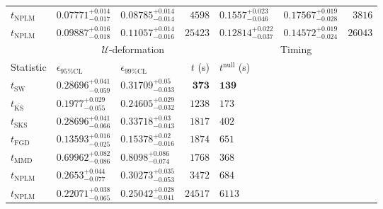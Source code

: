\begin{tabular}{l|llr|llr}
\rowcolor{red!35}	$t_{\mathrm{NPLM}}$ & $0.07771_{-0.017}^{+0.014}$ & $0.08785_{-0.014}^{+0.014}$ & $4598$ & $0.1557_{-0.046}^{+0.023}$ & $0.17567_{-0.028}^{+0.019}$ & $3816$ \\
\rowcolor{blue!35}	$t_{\mathrm{NPLM}}$ & $0.09887_{-0.018}^{+0.016}$ & $0.11057_{-0.016}^{+0.014}$ & $25423$ & $0.12814_{-0.037}^{+0.022}$ & $0.14572_{-0.024}^{+0.019}$ & $26043$ \\
	\toprule
	\multicolumn{1}{c}{} & \multicolumn{3}{c}{$\mathcal{U}$-deformation} & \multicolumn{3}{c}{Timing} \\
Statistic & $\epsilon_{95\%\mathrm{CL}}$ & $\epsilon_{99\%\mathrm{CL}}$ & $t$ (s) & $t^{\mathrm{null}}$ (s) \\
	\midrule
	$t_{\mathrm{SW}}$ & $0.28696_{-0.059}^{+0.041}$ & $0.31709_{-0.033}^{+0.05}$ & ${\mathbf{373}}$ & ${\mathbf{139}}$ \\
	$t_{\overline{\mathrm{KS}}}$ & $0.1977_{-0.055}^{+0.029}$ & $0.24605_{-0.032}^{+0.029}$ & $1238$ & $173$ \\
	$t_{\mathrm{SKS}}$ & $0.28696_{-0.066}^{+0.041}$ & $0.33718_{-0.043}^{+0.03}$ & $1817$ & $402$ \\
	$t_{\mathrm{FGD}}$ & ${\mathbf{0.13593_{-0.025}^{+0.016}}}$ & ${\mathbf{0.15378_{-0.016}^{+0.02}}}$ & $1874$ & $651$ \\
	$t_{\mathrm{MMD}}$ & $0.69962_{-0.086}^{+0.082}$ & $0.8098_{-0.074}^{+0.086}$ & $1768$ & $368$ \\
\rowcolor{red!35}	$t_{\mathrm{NPLM}}$ & $0.2653_{-0.077}^{+0.044}$ & $0.30273_{-0.053}^{+0.035}$ & $3472$ & $684$ \\
\rowcolor{blue!35}	$t_{\mathrm{NPLM}}$ & $0.22071_{-0.065}^{+0.038}$ & $0.25042_{-0.041}^{+0.028}$ & $24517$ & $6113$ \\
	\bottomrule
\end{tabular}